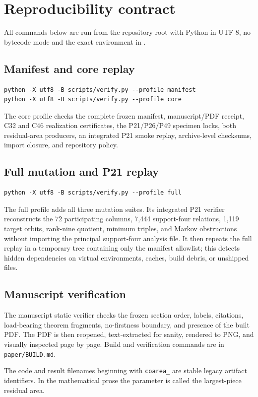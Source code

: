\section{Reproducibility contract}\label{app:reproduction}

All commands below are run from the repository root with Python in UTF-8,
no-bytecode mode and the exact environment in .

\subsection{Manifest and core replay}

\begin{verbatim}
python -X utf8 -B scripts/verify.py --profile manifest
python -X utf8 -B scripts/verify.py --profile core
\end{verbatim}

The core profile checks the complete frozen manifest, manuscript/PDF receipt,
C32 and C46 realization certificates, the P21/P26/P49 specimen locks, both
residual-area producers, an integrated P21 smoke replay, archive-level
checksums, import closure, and repository policy.

\subsection{Full mutation and P21 replay}

\begin{verbatim}
python -X utf8 -B scripts/verify.py --profile full
\end{verbatim}

The full profile adds all three mutation suites.  Its integrated P21 verifier
reconstructs the 72 participating columns, 7,444
support-four relations, 1,119 target orbits, rank-nine quotient, minimum
triples, and Markov obstructions without importing the principal
support-four analysis file.  It then repeats the full replay in a temporary
tree containing only the manifest allowlist; this detects hidden dependencies
on virtual environments, caches, build debris, or unshipped files.

\subsection{Manuscript verification}

The manuscript static verifier checks the frozen section order, labels,
citations, load-bearing theorem fragments, no-firstness boundary, and
presence of the built PDF.  The PDF is then reopened, text-extracted for
sanity, rendered to PNG, and visually inspected page by page.  Build and
verification commands are in \texttt{paper/BUILD.md}.

The code and result filenames beginning with \texttt{coarea\_} are stable
legacy artifact identifiers.  In the mathematical prose the parameter is
called the largest-piece residual area.
